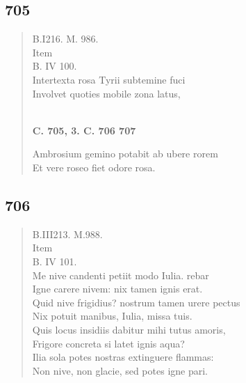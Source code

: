 \documentclass[11pt, a4paper]{report}
\begin{document}
            \subsection*{705}
      \begin{verse}
      B.I216. M. 986. \\  \lbrack Item \rbrack  \\ B. IV 100. \\ Intertexta rosa Tyrii subtemine fuci \\ Involvet quoties mobile zona latus, \\ 
        ﻿\pagebreak 
    \begin{center} \textbf{C. 705, 3. C. 706 707} \end{center} \marginpar{[173]} Ambrosium gemino potabit ab ubere rorem \\ Et vere roseo fiet odore rosa. \\ 
      \end{verse}
  
            \subsection*{706}
      \begin{verse}
      B.III213. M.988. \\ Item \\ B. IV 101. \\ Me nive candenti petiit modo Iulia. rebar \\ Igne carere nivem: nix tamen ignis erat. \\ Quid nive frigidius? nostrum tamen urere pectus \\ Nix potuit manibus, Iulia, missa tuis. \\ Quis locus insidiis dabitur mihi tutus amoris, \\ Frigore concreta si latet ignis aqua? \\ Ilia sola potes nostras extinguere flammas: \\ Non nive, non glacie, sed potes igne pari. \\ 
      \end{verse}
  
\end{document}
